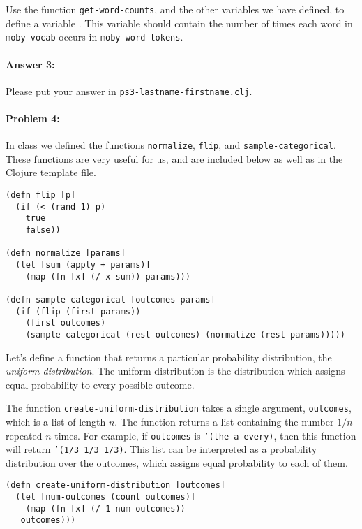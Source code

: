 \documentclass[10pt]{article}
\newcommand{\required}[1]{{\color{blue}{#1}}}
\newcommand{\PSnum}{3}
\begin{document}
Use the function \texttt{get-word-counts}, and the other variables we have
defined, to define a variable \required{\texttt{moby-word-frequencies}}. This variable
should contain the number of times each word in \texttt{moby-vocab} occurs in
\texttt{moby-word-tokens}.


\paragraph{Answer 3:} Please put your answer in \texttt{ps\PSnum-lastname-firstname.clj}.

\noindent\hrulefill %


\paragraph{Problem 4:}
In class we defined the functions \texttt{normalize}, \texttt{flip},
and \texttt{sample-categorical}. These functions are very useful for
us, and are included below as well as in the Clojure template file.

\begin{lstlisting}
(defn flip [p]
  (if (< (rand 1) p)
    true
    false))

(defn normalize [params]
  (let [sum (apply + params)]
    (map (fn [x] (/ x sum)) params)))

(defn sample-categorical [outcomes params]
  (if (flip (first params))
    (first outcomes)
    (sample-categorical (rest outcomes) (normalize (rest params)))))
\end{lstlisting}

Let's define a function that returns a particular probability
distribution, the \emph{uniform distribution}. The uniform distribution is
the distribution which assigns equal probability to every possible
outcome.
  
The function \texttt{create-uniform-distribution} takes a single argument,
\texttt{outcomes}, which is a list of length $n$. The function returns a list
 containing the number $1/n$ repeated $n$ times. For example, if
\texttt{outcomes} is \texttt{'(the a every)}, then this function will
 return \texttt{'(1/3 1/3 1/3)}. This list can be interpreted as a
 probability distribution over the outcomes, which assigns equal probability
 to each of them.

\begin{lstlisting}
(defn create-uniform-distribution [outcomes]
  (let [num-outcomes (count outcomes)]
    (map (fn [x] (/ 1 num-outcomes))
   outcomes)))
\end{lstlisting}
\end{document}
